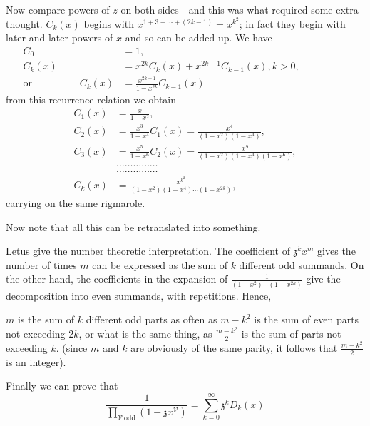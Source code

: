 Now compare powers of $z$ on both sides - and this was what required
some extra thought. $C_k(x)$ begins with $x^{1+3+\cdots+(2k-1)}=
x^{k^2}$; in fact they begin with later and later powers of $x$ and so
can be added up. We have
\begin{align*}
  C_0 & =1,\\
  C_k(x) & = x^{2k} C_k (x) + x^{2k-1} C_{k-1} (x), k> 0,\hspace{2cm}\\
  \text{or} \hspace{2cm} C_k (x) & = \frac{x^{2k-1}}{1-x^{2k}} C_{k-1} (x)
\end{align*}
from this recurrence relation we obtain
\begin{align*}
  C_1(x) & = \frac{x}{1-x^2},\\
  C_2(x) & = \frac{x^3}{1-x^4} C_1 (x) = \frac{x^4}{(1-x^2)(1-x^4)},\\
  C_3 (x) & = \frac{x^5}{1-x^6}  C_2(x)= \frac{x^9}{(1-x^2)(1-x^4)(1-x^6)},\\
  & \dots \dots \dots \dots \dots\\
  & \dots \dots \dots \dots \dots\\
  C_k(x) & = \frac{x^{k^2}}{(1-x^2)(1-x^4)\cdots (1-x^{2k})},
\end{align*}
carrying on the same rigmarole.

Now note that all this can be retranslated into something.

Let\pageoriginale  us give the number theoretic interpretation. The coefficient of
$\mathfrak{z}^k x^m$ gives the number of times $m$ can be expressed as
the sum of $k$ different odd summands. On the other hand, the
coefficients in the expansion of $\frac{1}{(1-x^2)\cdots (1-x^{2k})}$
give the decomposition into even summands, with repetitions. Hence,

\begin{thm}\label{part1:lec2:thm4} %
  $m$ is the sum of $k$ different odd parts as often as $m-k^2$ is the
  sum of even parts not exceeding $2k$, or what is the same thing, as
  $\frac{m-k^2}{2}$ is the sum of parts not exceeding $k$. (since $m$
  and $k$ are obviously of the same parity, it follows that
  $\frac{m-k^2}{2}$ is an integer).
\end{thm}

Finally we can prove that 
\begin{equation*}
  \frac{1}{\prod_{\mathcal{V} ~\text{odd}} (1-
    \mathfrak{z}x^\mathcal{V})} = \sum_{k=0}^\infty \mathfrak{z}^k
  D_k(x)\tag{6}\label{part1:lec2:eq6}
\end{equation*}

